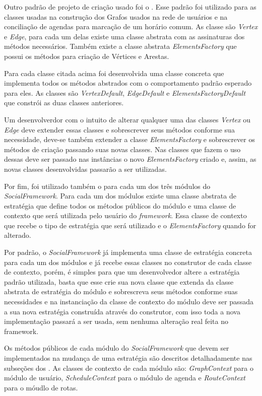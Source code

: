 Outro padrão de projeto de criação usado foi o . Esse padrão foi utilizado para as classes usadas na construção dos Grafos usados na rede de usuários e na conciliação de agendas para marcação de um horário comum. As classe são \textit{Vertex} e \textit{Edge}, para cada um delas existe uma classe abstrata com as assinaturas dos métodos necessários. Também existe a classe abstrata \textit{ElementsFactory} que possui os métodos para criação de Vértices e Arestas.

Para cada classe citada acima foi desenvolvida uma classe concreta que implementa todos os métodos abstrados com o comportamento padrão esperado para eles. As classes são \textit{VertexDefault}, \textit{EdgeDefault} e \textit{ElementsFactoryDefault} que constrói as duas classes anteriores.

Um desenvolverdor com o intuito de alterar qualquer uma das classes \textit{Vertex} ou \textit{Edge} deve extender essas classes e sobrescrever seus métodos conforme sua necessidade, deve-se também extender a classe \textit{ElementsFactory} e sobrescrever os métodos de criação passando suas novas classes. Nas classes que fazem o uso dessas deve ser passado nas instâncias o novo \textit{ElementsFactory} criado e, assim, as novas classes desenvolvidas passarão a ser utilizadas.

Por fim, foi utilizado também o  para cada um dos três módulos do \textit{SocialFramework}. Para cada um dos módulos existe uma classe abstrata de estratégia que define todos os métodos públicos do módulo e uma classe de contexto que será utilizada pelo usuário do \textit{framework}. Essa classe de contexto que recebe o tipo de estratégia que será utilizado e o \textit{ElementsFactory} quando for alterado.

Por padrão, o \textit{SocialFramework} já implementa uma classe de estratégia concreta para cada um dos módulos e já recebe essas classes no construtor de cada classe de contexto, porém, é simples para que um desenvolvedor altere a estratégia padrão utilizada, basta que esse crie sua nova classe que extenda da classe abstrata de estratégia do módulo e sobrescreva seus métodos conforme suas necessidades e na instanciação da classe de contexto do módulo deve ser passada a sua nova estratégia construída através do construtor, com isso toda a nova implementação passará a ser usada, sem nenhuma alteração real feita no framework.

Os métodos públicos de cada módulo do \textit{SocialFramework} que devem ser implementados na mudança de uma estratégia são descritos detalhadamente nas subseções dos . As classes de contexto de cada módulo são: \textit{GraphContext} para o módulo de usuário, \textit{ScheduleContext} para o módulo de agenda e \textit{RouteContext} para o móudlo de rotas.

